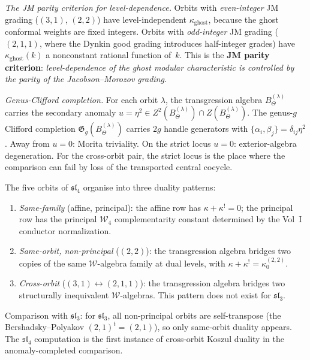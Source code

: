 \begin{construction}
\emph{The JM parity criterion for level-dependence.}
Orbits with \emph{even-integer} JM grading ($(3,1)$, $(2,2)$)
have level-independent $\kappa_{\mathrm{ghost}}$, because
the ghost conformal weights are fixed integers.
Orbits with \emph{odd-integer} JM grading ($(2,1,1)$, where
the Dynkin good grading introduces half-integer grades)
have $\kappa_{\mathrm{ghost}}(k)$ a nonconstant rational function
of~$k$. This is the \textbf{JM parity criterion}:
\emph{level-dependence of the ghost modular characteristic is
controlled by the parity of the Jacobson--Morozov grading.}

\emph{Genus-Clifford completion.}
For each orbit $\lambda$, the transgression algebra
$B_\Theta^{(\lambda)}$ carries the secondary anomaly
$u=\eta^2\in Z^2(B_\Theta^{(\lambda)})\cap Z(B_\Theta^{(\lambda)})$.
The genus-$g$ Clifford completion
$\mathfrak G_g(B_\Theta^{(\lambda)})$ carries $2g$ handle generators
with $\{\alpha_i,\beta_j\}=\delta_{ij}\eta^2$. Away from $u=0$:
Morita triviality. On the strict locus $u=0$: exterior-algebra
degeneration. For the cross-orbit pair, the strict locus is the
place where the comparison can fail by loss of the transported
central cocycle.
\end{construction}

\begin{remark}
\label{rem:sl4-three-duality-patterns}
The five orbits of $\mathfrak{sl}_4$ organise into three duality patterns:
\begin{enumerate}[label=\textup{(\roman*)}]
\item \emph{Same-family} (affine, principal):
 the affine row has $\kappa+\kappa^!=0$; the principal row has the
 principal \(\mathcal W_4\) complementarity constant determined by
 the Vol~I conductor normalization.
\item \emph{Same-orbit, non-principal} ($(2,2)$):
 the transgression algebra bridges two copies of the same
 $\mathcal W$-algebra family at dual levels, with
 $\kappa+\kappa^!=\kappa_0^{(2,2)}$.
\item \emph{Cross-orbit} ($(3,1)\leftrightarrow(2,1,1)$):
 the transgression algebra bridges two structurally inequivalent
 $\mathcal W$-algebras. This pattern does not exist for $\mathfrak{sl}_3$.
\end{enumerate}
Comparison with $\mathfrak{sl}_3$: for $\mathfrak{sl}_3$, all
non-principal orbits are self-transpose
(the Bershadsky--Polyakov $(2,1)^t=(2,1)$), so only same-orbit
duality appears. The $\mathfrak{sl}_4$ computation is the first
instance of cross-orbit Koszul duality in the anomaly-completed
comparison.
\end{remark}

